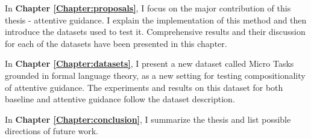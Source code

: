 	In \textbf{Chapter \ref{Chapter:proposals}}, I focus on the major contribution of this thesis - attentive guidance. I explain the implementation of this method and then introduce the datasets used to test it. Comprehensive results and their discussion for each of the datasets have been presented in this chapter.
	
	
	
	In \textbf{Chapter \ref{Chapter:datasets}}, I present a new dataset called Micro Tasks grounded in formal language theory, as a new setting for testing compositionality of attentive guidance. The experiments and results on this dataset for both baseline and attentive guidance follow the dataset description.
	
	In \textbf{Chapter \ref{Chapter:conclusion}}, I summarize the thesis and list possible directions of future work.


				
